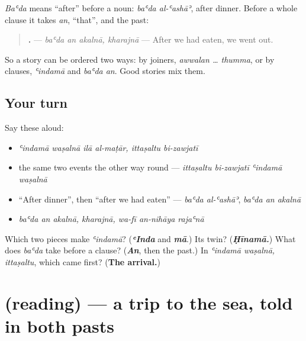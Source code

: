 \begin{grammarlens}[title={Grammar Lens: one event after another}]
\emph{Baʿda} means \textquotedblleft{}after\textquotedblright{} before a noun: \emph{baʿda al-ʿashāʾ}, after dinner. Before a whole clause it takes \emph{an}, \textquotedblleft{}that\textquotedblright{}, and the past:

\begin{quote}
\textbf{   .} — \emph{baʿda an akalnā, kharajnā} — After we had eaten, we went out.
\end{quote}

So a story can be ordered two ways: by joiners, \emph{awwalan … thumma}, or by clauses, \emph{ʿindamā} and \emph{baʿda an}. Good stories mix them.
\end{grammarlens}

\subsection*{Your turn}
Say these aloud:

\begin{itemize}
\raggedright
  \item \emph{ʿindamā waṣalnā ilā al-maṭār, ittaṣaltu bi-zawjatī}
  \item the same two events the other way round — \emph{ittaṣaltu bi-zawjatī ʿindamā waṣalnā}
  \item \textquotedblleft{}After dinner\textquotedblright{}, then \textquotedblleft{}after we had eaten\textquotedblright{} — \emph{baʿda al-ʿashāʾ}, \emph{baʿda an akalnā}
  \item \emph{baʿda an akalnā, kharajnā, wa-fī an-nihāya rajaʿnā}
\end{itemize}

\begin{tcolorbox}[breakable,colback=teal!4,colframe=teal!35!black,title={Before you move on}]
Which two pieces make \emph{ʿindamā}? (\emph{\textbf{ʿInda}} and \emph{\textbf{mā}}.) Its twin? (\emph{\textbf{Ḥīnamā.}}) What does \emph{baʿda} take before a clause? (\emph{\textbf{An}}, then the past.) In \emph{ʿindamā waṣalnā, ittaṣaltu}, which came first? (\textbf{The arrival.})
\end{tcolorbox}
\section[(reading)]{(reading) — a trip to the sea, told in both pasts}

\label{lesson:AR-C284-qissat-rihla}



